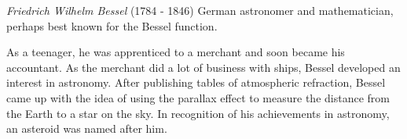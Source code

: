 \documentclass[12pt]{article}
\begin{document}
\emph{Friedrich Wilhelm Bessel} (1784 - 1846) German astronomer and mathematician, perhaps best known for the Bessel function.

As a teenager, he was apprenticed to a merchant and soon became his accountant. As the merchant did a lot of business with ships, Bessel developed an interest in astronomy. After publishing tables of atmospheric refraction, Bessel came up with the idea of using the parallax effect to measure the distance from the Earth to a star on the sky. In recognition of his achievements in astronomy, an asteroid was named after him.
\end{document}
